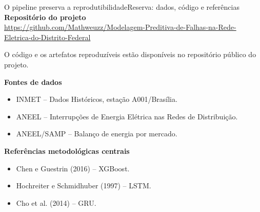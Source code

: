 \documentclass[10pt]{beamer}
\begin{document}
\begin{frame}[noframenumbering]{O pipeline preserva a reprodutibilidade}{Reserva: dados, código e referências}
  \small
  \textbf{Repositório do projeto}\\
  {\scriptsize\url{https://github.com/Mathweuzz/Modelagem-Preditiva-de-Falhas-na-Rede-Eletrica-do-Distrito-Federal}}

  \vspace{0.5em}
  O código e os artefatos reproduzíveis estão disponíveis no repositório público do projeto.

  \vspace{0.6em}
  \textbf{Fontes de dados}
  \begin{itemize}
    \item INMET -- Dados Históricos, estação A001/Brasília.
    \item ANEEL -- Interrupções de Energia Elétrica nas Redes de Distribuição.
    \item ANEEL/SAMP -- Balanço de energia por mercado.
  \end{itemize}

  \textbf{Referências metodológicas centrais}
  \begin{itemize}
    \item Chen e Guestrin (2016) -- XGBoost.
    \item Hochreiter e Schmidhuber (1997) -- LSTM.
    \item Cho et al. (2014) -- GRU.
  \end{itemize}

\end{frame}
\end{document}
